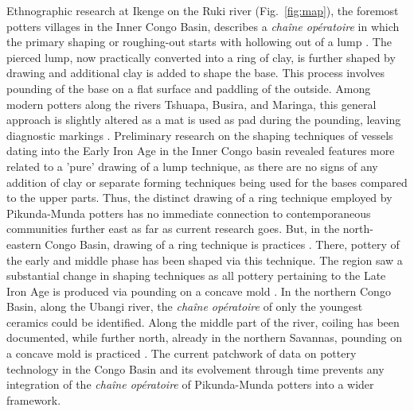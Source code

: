 \documentclass[smallextended,natbib]{svjour3}       %
\begin{document}
Ethnographic research at Ikenge on the Ruki river (Fig.~\ref{fig:map}), the foremost potters villages in the Inner Congo Basin, describes a \textit{chaîne opératoire} in which the primary shaping or roughing-out starts with hollowing out of a lump \citep{Eggert.1980c}. The pierced lump, now practically converted into a ring of clay, is further shaped by drawing and additional clay is added to shape the base. This process involves pounding of the base on a flat surface and paddling of the outside. Among modern potters along the rivers Tshuapa, Busira, and Maringa, this general approach is slightly altered as a mat is used as pad during the pounding, leaving diagnostic markings \citep[188,196--197]{Wotzka.1995}. Preliminary research on the shaping techniques of vessels dating into the Early Iron Age in the Inner Congo basin revealed features more related to a 'pure' drawing of a lump technique, as there are no signs of any addition of clay or separate forming techniques being used for the bases compared to the upper parts. Thus, the distinct drawing of a ring technique employed by Pikunda-Munda potters has no immediate connection to contemporaneous communities further east as far as current research goes. But, in the north-eastern Congo Basin, drawing of a ring technique is practices \citep[110,115]{LivingstoneSmith.2017}. There, pottery of the early and middle phase has been shaped via this technique. The region saw a substantial change in shaping techniques as all pottery pertaining to the Late Iron Age is produced via pounding on a concave mold \citep[111,115]{LivingstoneSmith.2017}. In the northern Congo Basin, along the Ubangi river, the \textit{chaîne opératoire} of only the youngest ceramics could be identified. Along the middle part of the river, coiling has been documented, while further north, already in the northern Savannas, pounding on a concave mold is practiced \citep[55--60 Fig.~19--20,73]{Seidensticker.2021e}. The current patchwork of data on pottery technology in the Congo Basin and its evolvement through time prevents any integration of the \textit{chaîne opératoire} of Pikunda-Munda potters into a wider framework.

\end{document}
